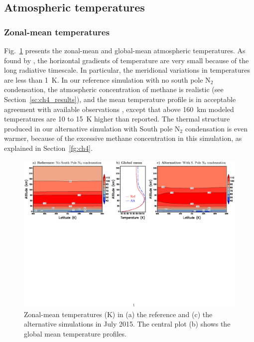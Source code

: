 \subsection{Atmospheric temperatures}

\subsubsection{Zonal-mean temperatures}

Fig.~\ref{fg:sectionT} presents the zonal-mean and global-mean atmospheric 
temperatures. As found by \cite{Toig:15}, the horizontal gradients of temperature 
are very small because of the long radiative timescale. In particular, the meridional variations in
temperatures are less than 1~K. In our reference simulation with no south pole N$_2$ condensation,
the atmospheric concentration of methane is realistic (see Section~\ref{sc:ch4_results}), and the
mean temperature profile is in acceptable agreement with available observations 
\citep{Hins:15dps,Glad:16,Dias:15}, except that above 160~km modeled temperatures are 10 to 15~K higher
than reported. The thermal structure produced in our alternative simulation with South pole N$_2$
condensation is even warmer, because of the excessive methane concentration in this
simulation, as explained in Section~\ref{fg:ch4}.

\begin{figure}
  \begin{center}
\hspace*{-1cm}
   \includegraphics[width=18.cm,angle=-0,clip]{figures/fig_tempzon.eps} 
    \caption{
\label{fg:sectionT}
Zonal-mean temperatures (K) in (a) the reference
 and (c) the alternative simulations in July 2015. The central plot (b) shows 
the global mean temperature profiles.
}
  \end{center}
\end{figure}




